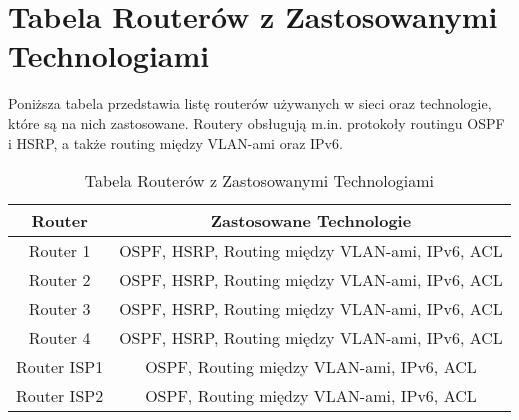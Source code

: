 \section{Tabela Routerów z Zastosowanymi Technologiami}

Poniższa tabela przedstawia listę routerów używanych w sieci oraz technologie, które są na nich zastosowane. Routery obsługują m.in. protokoły routingu OSPF i HSRP, a także routing między VLAN-ami oraz IPv6.

\begin{table}[htbp]
\centering
\caption{Tabela Routerów z Zastosowanymi Technologiami}
\begin{tabular}{|c|c|}
\hline
\textbf{Router} & \textbf{Zastosowane Technologie}             \\ \hline
Router 1        & OSPF, HSRP, Routing między VLAN-ami, IPv6, ACL    \\ \hline
Router 2        & OSPF, HSRP, Routing między VLAN-ami, IPv6, ACL    \\ \hline
Router 3        & OSPF, HSRP, Routing między VLAN-ami, IPv6, ACL    \\ \hline
Router 4        & OSPF, HSRP, Routing między VLAN-ami, IPv6, ACL    \\ \hline
Router ISP1     & OSPF, Routing między VLAN-ami, IPv6, ACL     \\ \hline
Router ISP2     & OSPF, Routing między VLAN-ami, IPv6, ACL     \\ \hline
\end{tabular}
\end{table}

